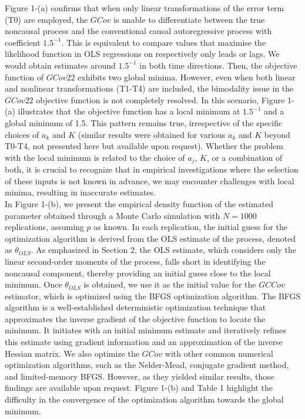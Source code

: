 \documentclass[<1p>]{elsarticle} %
\begin{document}
Figure 1-(a) confirms that when only linear transformations of the error term (T0) are employed, the $GCov$ is unable to differentiate between the true noncausal process and the conventional causal autoregressive process with coefficient $1.5^{-1}$. This is equivalent to compare values that maximise the likelihood function in OLS regressions on respectively only leads or lags. We would obtain estimates around $1.5^{-1}$ in both time directions.
Then, the objective function of $GCov22$ exhibits two global minima. However, even when both linear and nonlinear transformations (T1-T4) are included, the bimodality issue in the $GCov22$ objective function is not completely resolved. In this scenario, Figure 1-(a) illustrates that the objective function has a local minimum at $1.5^{-1}$
and a global minimum of 1.5. This pattern remains true, irrespective of the specific choices of $a_k$ and $K$ (similar results were obtained for various $a_k$ and $K$ beyond T0-T4, not presented here but available upon request). Whether the problem with the local minimum is related to the choice of $a_j$, $K$, or a combination of both, it is crucial to recognize that in empirical investigations where the selection of these inputs is not known in advance, we may encounter challenges with local minima, resulting in inaccurate estimates.\\
\indent In Figure 1-(b), we present the empirical density function of the estimated parameter obtained through a Monte Carlo simulation with $N=1000$ replications, assuming $p$ as known. In each replication, the initial guess for the optimization algorithm is derived from the OLS estimate of the process, denoted as $\theta_{OLS}$. As emphasized in Section 2, the OLS estimate, which considers only the linear second-order moments of the process, falls short in identifying the noncausal component, thereby providing an initial guess close to the local minimum. Once $\theta_{OLS}$ is obtained, we use it as the initial value for the $GCCov$ estimator, which is optimized using the BFGS optimization algorithm. The BFGS algorithm is a well-established deterministic optimization technique that approximates the inverse gradient of the objective function to locate the minimum. It initiates with an initial minimum estimate and iteratively refines this estimate using gradient information and an approximation of the inverse Hessian matrix. We also optimize the $GCov$ with other common numerical optimization algorithms, such as the Nelder-Mead, conjugate gradient method, and limited-memory BFGS. However, as they yielded similar results, those findings are available upon request. Figure 1-(b) and Table 1 highlight the difficulty in the convergence of the optimization algorithm towards the global minimum.\\
\end{document}
